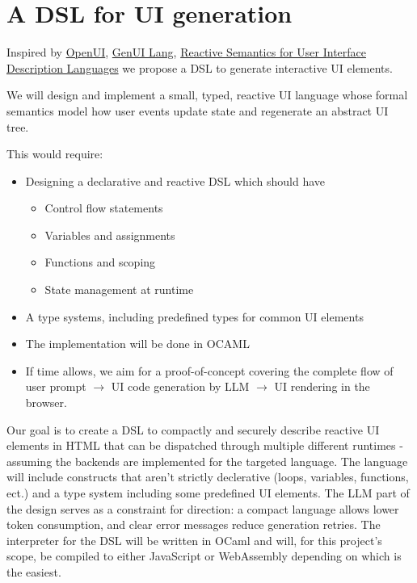 \section{A DSL for UI generation}

Inspired by \href{https://www.openui.com/}{OpenUI}, \href{https://gen-ui-lang.github.io/}{GenUI Lang}, \href{https://arxiv.org/pdf/2508.13610}{Reactive Semantics for User Interface Description Languages} we propose a DSL to generate interactive UI elements.

We will design and implement a small, typed, reactive UI language whose formal semantics model how user events update state and regenerate an abstract UI tree.

\noindent This would require:
\begin{itemize}
    \item Designing a declarative and reactive DSL which should have
    	\begin{itemize}
    		\item Control flow statements 
    		\item Variables and assignments
    		\item Functions and scoping
    		\item State management at runtime
    	\end{itemize}
    \item A type systems, including predefined types for common UI elements
    \item The implementation will be done in OCAML
    \item If time allows, we aim for a proof-of-concept covering the complete flow of user prompt $\rightarrow$ UI code generation by LLM $\rightarrow$ UI rendering in the browser.
\end{itemize}

Our goal is to create a DSL to compactly and securely describe reactive UI elements in HTML that can be dispatched through multiple different runtimes - assuming the backends are implemented for the targeted language. The language will include constructs that aren't strictly declerative (loops, variables, functions, ect.) and a type system including some predefined UI elements. The LLM part of the design serves as a constraint for direction: a compact language allows lower token consumption, and clear error messages reduce generation retries. The interpreter for the DSL will be written in OCaml and will, for this project's scope, be compiled to either JavaScript or WebAssembly depending on which is the easiest. \newline


